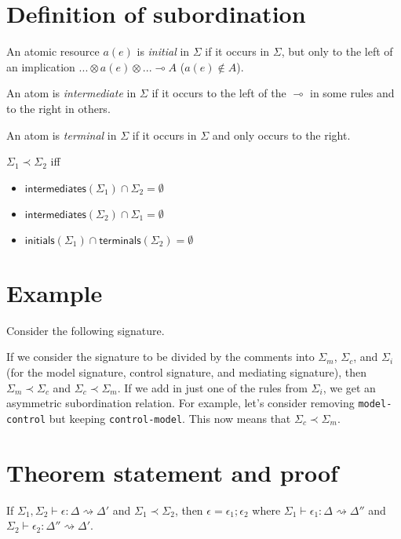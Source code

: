 \documentclass{article}
\newcommand{\lolli}{\multimap}
\newcommand{\tensor}{\otimes}
\newcommand{\subord}{\prec}
\newcommand{\inits}{\mathsf{initials}}
\newcommand{\interms}{\mathsf{intermediates}}
\newcommand{\terms}{\mathsf{terminals}}
\newcommand{\eps}{\epsilon}
\newcommand{\stepsto}{\rightsquigarrow}
\begin{document}
\section{Definition of subordination}

An atomic resource $a(e)$ is {\em initial} in $\Sigma$ if it occurs in
$\Sigma$, but only to the left of an implication 
$... \tensor a(e) \tensor ... \lolli {A}$ ($a(e) \notin A$).

An atom is {\em intermediate} in $\Sigma$ if it occurs to the left of
the $\lolli$ in some rules and to the right in others.

An atom is {\em terminal} in $\Sigma$ if it occurs in $\Sigma$ and only
occurs to the right.

$\Sigma_1 \subord \Sigma_2$ iff

\begin{itemize}
\item $\interms(\Sigma_1) \cap \Sigma_2 = \emptyset$
\item $\interms(\Sigma_2) \cap \Sigma_1 = \emptyset$
\item $\inits(\Sigma_1) \cap \terms(\Sigma_2) = \emptyset$
\end{itemize}



\section{Example}

Consider the following signature.



If we consider the signature to be divided by the comments into $\Sigma_m$,
$\Sigma_c$, and $\Sigma_i$ (for the model signature, control signature, and
mediating signature), then $\Sigma_m \subord \Sigma_c$ and $\Sigma_c
\subord \Sigma_m$. If we add in just one of the rules from $\Sigma_i$, we
get an asymmetric subordination relation. For example, let's consider
removing \verb|model-control| but keeping \verb|control-model|. This now
means that $\Sigma_c \subord \Sigma_m$.


\section{Theorem statement and proof}

If $\Sigma_1, \Sigma_2 \vdash \eps : \Delta \stepsto \Delta'$
and $\Sigma_1 \subord \Sigma_2$, then
$\eps = \eps_1 ; \eps_2$ where
$\Sigma_1 \vdash \eps_1 : \Delta \stepsto \Delta''$
and
$\Sigma_2 \vdash \eps_2 : \Delta'' \stepsto \Delta'$.
\end{document}
